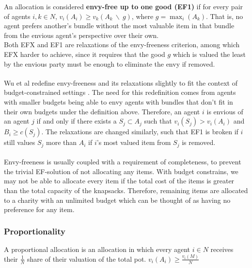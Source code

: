 \documentclass[b5paper]{article}
\begin{document}
An allocation is considered \textbf{envy-free up to one good (EF1)} if for every pair of agents $i, k \in N$,
$v_i(A_i) \geq v_k(A_k \: \backslash \: g)$, where $g = \max_i(A_k)$. That is, no agent prefers another's bundle without the most valuable item in that bundle from the envious agent's perspective over their own.\\

Both EFX and EF1 are relaxations of the envy-freeness criterion, among which EFX harder to achieve,
since it requires that the good $g$ which is valued the least by the envious party must be enough to eliminate the envy if removed.
\\ \\
Wu et al redefine envy-freeness and its relaxations slightly to fit the context of budget-constrained settings \cite{wu_budget-feasible_2020}.
The need for this redefinition comes from agents with smaller budgets being able to envy agents with bundles that don't fit in their own budgets under the definition above.
Therefore, an agent $i$ is envious of an agent $j$ if and only if there exists a $S_j \subset A_j$ such that $v_i(S_j) > v_i(A_i)$ and $B_i \ge c(S_j)$.
The relaxations are changed similarly, such that EF1 is broken if $i$ still values $S_j$ more than $A_i$ if $i$'s most valued item from $S_j$ is removed.
\\ \\
Envy-freeness is usually coupled with a requirement of completeness, to prevent the trivial EF-solution of not allocating any items.
With budget constrains, we may not be able to allocate every item if the total cost of the items is greater than the total capacity of the knapsacks.
Therefore, remaining items are allocated to a charity with an unlimited budget which can be thought of as having no preference for any item.

\subsubsection{Proportionality}
A proportional allocation is an allocation in which every agent $i \in N$ receives their \(\frac{1}{N}\) share of their valuation of the total pot.
$v_i(A_i) \geq \frac{v_i(M)}{N}$ \\
\end{document}
